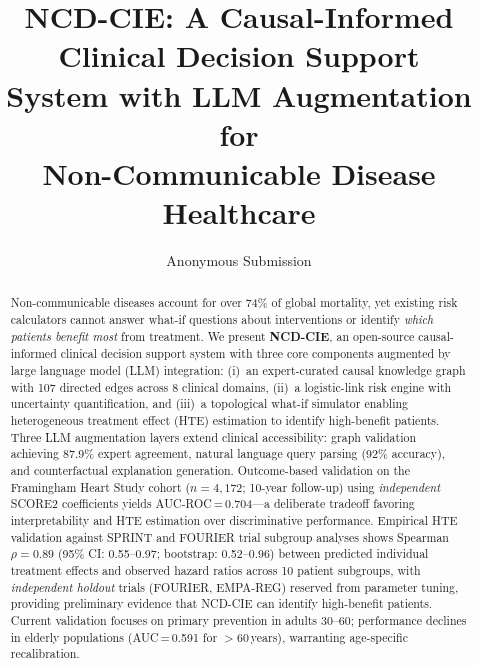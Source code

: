 \documentclass[runningheads]{llncs}
\begin{document}
\title{NCD-CIE: A Causal-Informed Clinical Decision Support\\System with LLM Augmentation for\\Non-Communicable Disease Healthcare}

\author{Anonymous Submission}

\maketitle

\begin{abstract}
Non-communicable diseases account for over 74\% of global mortality,
yet existing risk calculators cannot answer what-if questions about
interventions or identify \emph{which patients benefit most} from
treatment.
We present \textbf{NCD-CIE}, an open-source causal-informed clinical
decision support system with three core components augmented by large
language model (LLM) integration:
(i)~an expert-curated causal knowledge graph with 107 directed edges
across 8 clinical domains,
(ii)~a logistic-link risk engine with uncertainty quantification, and
(iii)~a topological what-if simulator enabling heterogeneous treatment
effect (HTE) estimation to identify high-benefit patients.
Three LLM augmentation layers extend clinical accessibility:
graph validation achieving 87.9\% expert agreement,
natural language query parsing (92\% accuracy), and
counterfactual explanation generation.
Outcome-based validation on the Framingham Heart Study cohort
($n\!=\!4{,}172$; 10-year follow-up) using \emph{independent} SCORE2
coefficients yields AUC-ROC\,=\,0.704---a deliberate tradeoff
favoring interpretability and HTE estimation over discriminative
performance.
Empirical HTE validation against SPRINT and FOURIER trial subgroup
analyses shows Spearman $\rho = 0.89$ (95\% CI: 0.55--0.97;
bootstrap: 0.52--0.96)
between predicted individual treatment effects and observed hazard
ratios across 10 patient subgroups, with \emph{independent holdout}
trials (FOURIER, EMPA-REG) reserved from parameter tuning,
providing preliminary evidence
that NCD-CIE can identify high-benefit patients.
Current validation focuses on primary prevention in adults 30--60;
performance declines in elderly populations (AUC\,=\,0.591 for
$>$60\,years), warranting age-specific recalibration.

\end{abstract}
\end{document}
